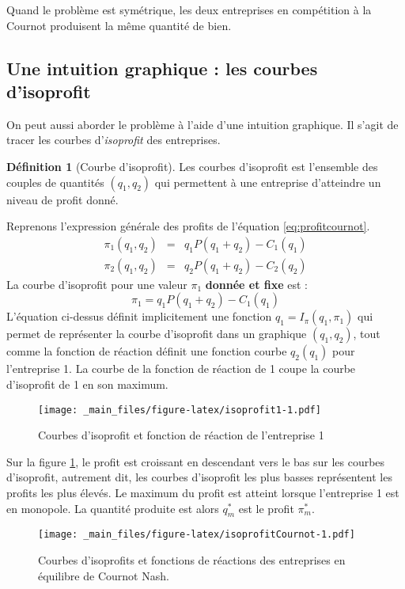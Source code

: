 \documentclass[
]{book}
\theoremstyle{definition}
\newtheorem{definition}{Définition}[chapter]
\theoremstyle{definition}
\theoremstyle{definition}
\theoremstyle{definition}
\theoremstyle{remark}
\begin{document}
Quand le problème est symétrique, les deux entreprises en compétition à la Cournot produisent la même quantité de bien.

\hypertarget{une-intuition-graphique-les-courbes-disoprofit}{%
\subsection{Une intuition graphique : les courbes d'isoprofit}\label{une-intuition-graphique-les-courbes-disoprofit}}

On peut aussi aborder le problème à l'aide d'une intuition graphique.
Il s'agit de tracer les courbes d'\emph{isoprofit} des entreprises.

\begin{definition}[Courbe d'isoprofit]
Les courbes d'isoprofit est l'ensemble des couples de quantités \((q_1, q_2)\) qui permettent à une entreprise d'atteindre un niveau de profit donné.
\end{definition}

Reprenons l'expression générale des profits de l'équation \eqref{eq:profitcournot}.
\[
\begin{array}{rcl}
\pi_1(q_1, q_2) &=& q_1P(q_1+q_2)-C_1(q_1)\\
\pi_2(q_1, q_2) &=& q_2P(q_1+q_2) -C_2(q_2)
\end{array}
\]
La courbe d'isoprofit pour une valeur \(\pi_1\) \textbf{donnée et fixe} est :
\[
\pi_1 = q_1P(q_1+q_2)-C_1(q_1)
\]
L'équation ci-dessus définit implicitement une fonction \(q_1=I_\pi(q_1, \pi_1)\) qui permet de représenter la courbe d'isoprofit dans un graphique \((q_1,q_2)\), tout comme la fonction de réaction définit une fonction courbe \(q_2(q_1)\) pour l'entreprise 1.
La courbe de la fonction de réaction de 1 coupe la courbe d'isoprofit de 1 en son maximum.

\begin{figure}
\centering
\texttt{[image: \_main\_files/figure-latex/isoprofit1-1.pdf]}
\caption{\label{fig:isoprofit1}Courbes d'isoprofit et fonction de réaction de l'entreprise 1}
\end{figure}

Sur la figure \ref{fig:isoprofit1}, le profit est croissant en descendant vers le bas sur les courbes d'isoprofit, autrement dit, les courbes d'isoprofit les plus basses représentent les profits les plus élevés.
Le maximum du profit est atteint lorsque l'entreprise 1 est en monopole.
La quantité produite est alors \(q_m^*\) est le profit \(\pi_m^*\).

\begin{figure}
\centering
\texttt{[image: \_main\_files/figure-latex/isoprofitCournot-1.pdf]}
\caption{\label{fig:isoprofitCournot}Courbes d'isoprofits et fonctions de réactions des entreprises en équilibre de Cournot Nash.}
\end{figure}
\end{document}
